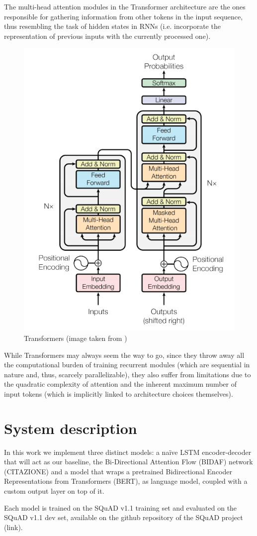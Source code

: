 \documentclass[a4paper,10pt]{report}
\begin{document}
The multi-head attention modules in the Transformer architecture are the ones responsible for gathering information from other tokens in the input sequence, thus resembling the task of hidden states in RNNs (i.e. incorporate the representation of previous inputs with the currently processed one).

\begin{figure}[h]
    \center
    \includegraphics[width=0.45\linewidth]{transformers}
    \caption{Transformers (image taken from \cite{transformers})}
    \label{fig:transformers}
\end{figure}

While Transformers may always seem the way to go, since they throw away all the computational burden of training recurrent modules (which are sequential in nature and, thus, scarcely parallelizable), they also suffer from limitations due to the quadratic complexity of attention and the inherent maximum number of input tokens (which is implicitly linked to architecture choices themselves).


\chapter{System description}\label{chap:system-description}

In this work we implement three distinct models: a naïve LSTM encoder-decoder that will act as our baseline, the Bi-Directional Attention Flow (BIDAF) network (CITAZIONE) and a model that wraps a pretrained Bidirectional Encoder Representations from Transformers (BERT), as language model, coupled with a custom output layer on top of it.

Each model is trained on the SQuAD v1.1 training set and evaluated on the SQuAD v1.1 dev set, available on the github repository of the SQuAD project (link).
\end{document}
